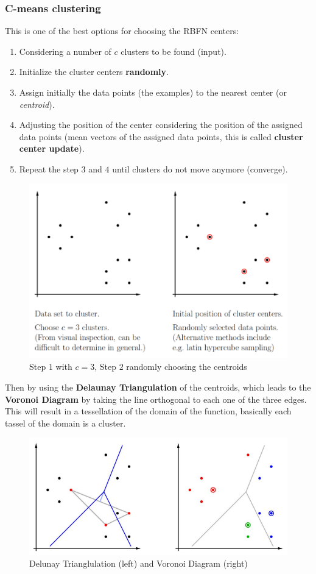 \documentclass{article}
\begin{document}
\subsubsection{C-means clustering}
This is one of the best options for choosing the RBFN centers:
\begin{enumerate}
    \item Considering a number of $c$ clusters to be found (input).
    \item Initialize the cluster centers \textbf{randomly}.
    \item Assign initially the data points (the examples) to the nearest center (or \textit{centroid}).
    \item Adjusting the position of the center considering the position of the assigned data points (mean
          vectors of the assigned data points, this is called \textbf{cluster center update}).
    \item Repeat the step $3$ and $4$ until clusters do not move anymore (converge).
\end{enumerate}
\begin{figure}[H]
    \centering
    \includegraphics[scale=0.4]{images/c-means.png}
    \caption{Step $1$ with $c=3$, Step $2$ randomly choosing the centroids}
\end{figure}
Then by using the \textbf{Delaunay Triangulation} of the centroids, which leads
to the \textbf{Voronoi Diagram} by taking the line orthogonal to each one of the three
edges. This will result in a tessellation of the domain of the function, basically
each tassel of the domain is a cluster.
\begin{figure}[H]
    \centering
    \includegraphics[scale=0.4]{images/c-means1.png}
    \caption{Delunay Trianglulation (left) and Voronoi Diagram (right)}
\end{figure}
\end{document}
